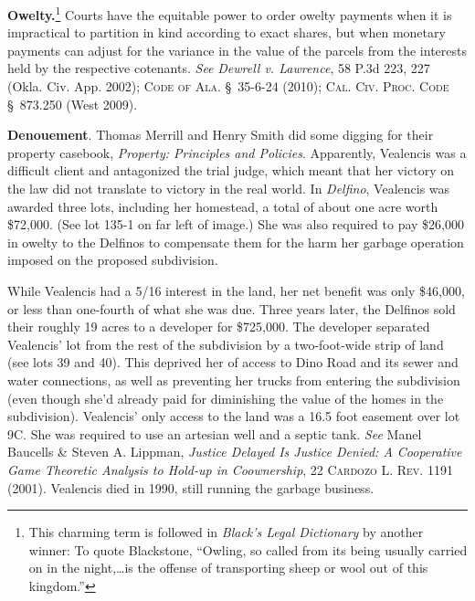 
\item \textbf{Owelty.}\footnote{This charming term is followed in
\textit{Black's Legal Dictionary} by another winner: To quote Blackstone,
``Owling, so called from its being usually carried on in the night,\dots is
the offense of transporting sheep or wool out of this kingdom.''} Courts have
the equitable power to order owelty payments when it is impractical to
partition in kind according to exact shares, but when monetary payments can
adjust for the variance in the value of the parcels from the interests held by
the respective cotenants. \textit{See} \emph{Dewrell v. Lawrence}, 58 P.3d 223,
227
(Okla. Civ. App. 2002); \textsc{Code of Ala.} \S~35-6-24 (2010); \textsc{Cal.
Civ. Proc. Code} \S~873.250 (West 2009).


\item \textbf{Denouement}. Thomas Merrill and Henry Smith did some digging for
their property casebook, \textit{Property: Principles and Policies}.
Apparently, Vealencis was a difficult client and antagonized the trial judge,
which meant that her victory on the law did not translate to victory in the
real world. In \textit{Delfino}, Vealencis was awarded three lots, including
her homestead, a total of about one acre worth \$72,000. (See lot 135-1 on far
left of image.) She was also required to pay \$26,000 in owelty to the
Delfinos to compensate them for the harm her garbage operation imposed on the
proposed subdivision.


While Vealencis had a 5/16 interest in the land, her net benefit was only
\$46,000, or less than one-fourth of what she was due. Three years later, the
Delfinos sold their roughly 19 acres to a developer for \$725,000. The
developer separated Vealencis' lot from the rest of the subdivision by a
two-foot-wide strip of land (see lots 39 and 40). This deprived her of access
to Dino Road and its sewer and water connections, as well as preventing her
trucks from entering the subdivision (even though she'd already paid for
diminishing the value of the homes in the subdivision). Vealencis' only access
to the land was a 16.5 foot easement over lot 9C. She was required to use an
artesian well and a septic tank. \textit{See} Manel Baucells \& Steven A.
Lippman, \textit{Justice Delayed Is Justice Denied: A Cooperative Game
Theoretic Analysis to Hold-up in Coownership}, 22 \textsc{Cardozo L. Rev.} 1191
(2001). Vealencis died in 1990, still running the garbage business.



